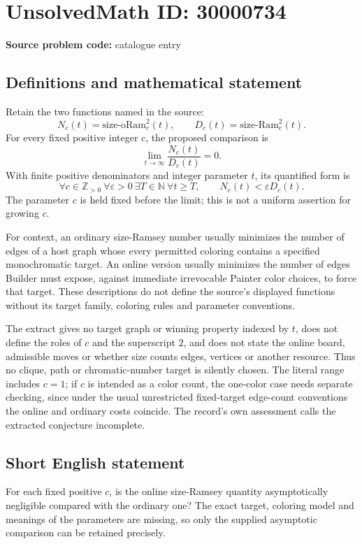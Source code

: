 \documentclass[11pt]{article}
\newcommand{\N}{\mathbb{N}}
\newcommand{\Z}{\mathbb{Z}}
\begin{document}
\section*{UnsolvedMath ID: 30000734}
\textbf{Source problem code:} catalogue entry
\subsection{Definitions and mathematical statement}
Retain the two functions named in the source:
\[
N_c(t)=\mathrm{size\text{-}oRam}_c^2(t),\qquad
D_c(t)=\mathrm{size\text{-}Ram}_c^2(t).
\]
For every fixed positive integer $c$, the proposed comparison is
\[
\lim_{t\to\infty}\frac{N_c(t)}{D_c(t)}=0.
\]
With finite positive denominators and integer parameter $t$, its quantified form is
\[
\forall c\in\Z_{>0}\ \forall\varepsilon>0\ \exists T\in\N\
\forall t\geq T,\qquad N_c(t)<\varepsilon D_c(t).
\]
The parameter $c$ is held fixed before the limit; this is not a uniform assertion for growing $c$.

For context, an ordinary size-Ramsey number usually minimizes the number of edges of a host graph whose every permitted coloring contains a specified monochromatic target. An online version usually minimizes the number of edges Builder must expose, against immediate irrevocable Painter color choices, to force that target. These descriptions do not define the source's displayed functions without its target family, coloring rules and parameter conventions.

The extract gives no target graph or winning property indexed by $t$, does not define the roles of $c$ and the superscript $2$, and does not state the online board, admissible moves or whether size counts edges, vertices or another resource. Thus no clique, path or chromatic-number target is silently chosen. The literal range includes $c=1$; if $c$ is intended as a color count, the one-color case needs separate checking, since under the usual unrestricted fixed-target edge-count conventions the online and ordinary costs coincide. The record's own assessment calls the extracted conjecture incomplete.
\subsection{Short English statement}
For each fixed positive $c$, is the online size-Ramsey quantity asymptotically negligible compared with the ordinary one? The exact target, coloring model and meanings of the parameters are missing, so only the supplied asymptotic comparison can be retained precisely.
\end{document}
